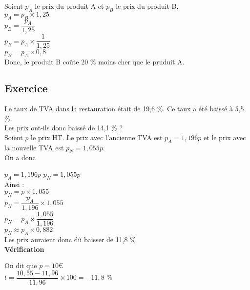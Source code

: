 Soient $p_A$ le prix du produit A et $p_B$ le prix du produit B. \\

$p_A = p_B \times 1,25 $ \\

$ p_B = \dfrac{p_A}{1,25} $ \\

$ p_B = p_A \times \dfrac{1}{1,25} $ \\

$ p_B = p_A \times 0,8 $ \\

Donc, le produit B coûte 20 \% moins cher que le pruduit A.

\subsection{Exercice }

Le taux de TVA dans la restauration était de 19,6 \%. Ce taux a été baissé à 5,5 \%. \\

Les prix ont-ils donc baissé de 14,1 \% ? \\

Soient $p$ le prix HT. Le prix avec l'ancienne TVA est $p_A = 1,196p$ et le prix avec la nouvelle TVA est $p_N = 1,055p$. \\


On a donc 

$p_A = 1,196p$
$ p_N = 1,055 p$ \\

Ainsi : \\

$p_N = p \times 1,055$ \\

$ p_N = \dfrac{p_A}{1,196} \times 1,055 $ \\

$ p_N = p_A \times \dfrac{1,055}{1,196} $ \\

$ p_N \approx p_A  \times 0,882 $ \\

Les prix auraient donc dû baisser de 11,8 \% \\

\textbf{Vérification} 

On dit que $p = 10$€ \\

$ t = \dfrac{10,55 - 11,96}{11,96} \times 100 = - 11,8$ \%

